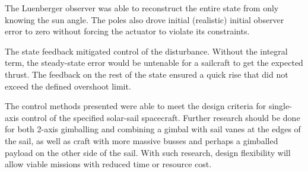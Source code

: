 \documentclass[]{aiaa-tc}%
\begin{document}
	\vspace{5 mm}

	The Luenberger observer was able to reconstruct the entire state from only knowing the sun angle. The poles also drove initial (realistic) initial observer error to zero without forcing the actuator to violate its constraints.

	\vspace{5 mm}

	The state feedback mitigated control of the disturbance. Without the integral term, the steady-state error would be untenable for a sailcraft to get the expected thrust.  The feedback on the rest of the state ensured a quick rise that did not exceed the defined overshoot limit.

	\vspace{5 mm}

	The control methods presented were able to meet the design criteria for single-axis control of the specified solar-sail spacecraft. Further research should be done for both 2-axis gimballing and combining a gimbal with sail vanes at the edges of the sail, as well as craft with more massive busses and perhaps a gimballed payload on the other side of the sail. With such research, design flexibility will allow viable missions with reduced time or resource cost.



%    
    
%    
%    
%    
%
%
%
%
	
\end{document}
